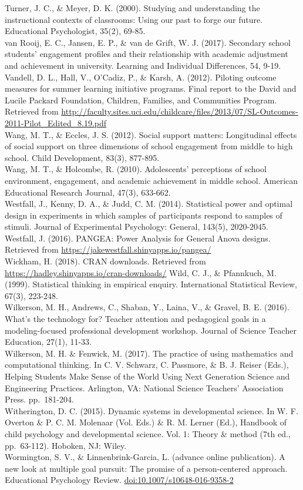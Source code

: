 \documentclass[]{book}
\theoremstyle{definition}
\theoremstyle{definition}
\theoremstyle{definition}
\theoremstyle{remark}
\begin{document}
Turner, J. C., \& Meyer, D. K. (2000). Studying and understanding the
instructional contexts of classrooms: Using our past to forge our
future. Educational Psychologist, 35(2), 69-85.\\
van Rooij, E. C., Jansen, E. P., \& van de Grift, W. J. (2017).
Secondary school students' engagement profiles and their relationship
with academic adjustment and achievement in university. Learning and
Individual Differences, 54, 9-19.\\
Vandell, D. L., Hall, V., O'Cadiz, P., \& Karsh, A. (2012). Piloting
outcome measures for summer learning initiative programs. Final report
to the David and Lucile Packard Foundation, Children, Families, and
Communities Program. Retrieved from
\url{http://faculty.sites.uci.edu/childcare/files/2013/07/SL-Outcomes-2011-Pilot_Edited_8.19.pdf}\\
Wang, M. T., \& Eccles, J. S. (2012). Social support matters:
Longitudinal effects of social support on three dimensions of school
engagement from middle to high school. Child Development, 83(3),
877-895.\\
Wang, M. T., \& Holcombe, R. (2010). Adolescents' perceptions of school
environment, engagement, and academic achievement in middle school.
American Educational Research Journal, 47(3), 633-662.\\
Westfall, J., Kenny, D. A., \& Judd, C. M. (2014). Statistical power and
optimal design in experiments in which samples of participants respond
to samples of stimuli. Journal of Experimental Psychology: General,
143(5), 2020-2045.\\
Westfall, J. (2016). PANGEA: Power Analysis for General Anova designs.
Retrieved from \url{https://jakewestfall.shinyapps.io/pangea/}\\
Wickham, H. (2018). CRAN downloads. Retrieved from
\url{https://hadley.shinyapps.io/cran-downloads/} Wild, C. J., \&
Pfannkuch, M. (1999). Statistical thinking in empirical enquiry.
International Statistical Review, 67(3), 223-248.\\
Wilkerson, M. H., Andrews, C., Shaban, Y., Laina, V., \& Gravel, B. E.
(2016). What's the technology for? Teacher attention and pedagogical
goals in a modeling-focused professional development workshop. Journal
of Science Teacher Education, 27(1), 11-33.\\
Wilkerson, M. H. \& Fenwick, M. (2017). The practice of using
mathematics and computational thinking. In C. V. Schwarz, C. Passmore,
\& B. J. Reiser (Eds.), Helping Students Make Sense of the World Using
Next Generation Science and Engineering Practices. Arlington, VA:
National Science Teachers' Association Press. pp.~181-204.\\
Witherington, D. C. (2015). Dynamic systems in developmental science. In
W. F. Overton \& P. C. M. Molenaar (Vol. Eds.) \& R. M. Lerner (Ed.),
Handbook of child psychology and developmental science. Vol. 1: Theory
\& method (7th ed., pp.~63-112). Hoboken, NJ: Wiley.\\
Wormington, S. V., \& Linnenbrink-Garcia, L. (advance online
publication). A new look at multiple goal pursuit: The promise of a
person-centered approach. Educational Psychology Review.
\url{doi:10.1007/s10648-016-9358-2}
\end{document}
